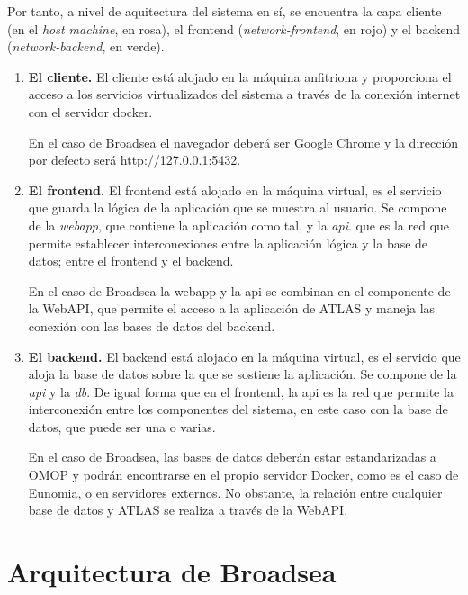 {\begin{enumerate}
\end{enumerate}

Por tanto, a nivel de aquitectura del sistema en sí, se encuentra la capa cliente (en el \textit{host machine}, en rosa), el frontend (\textit{network-frontend}, en rojo) y el backend (\textit{network-backend}, en verde).

\begin{enumerate}

    \item \textbf{El cliente.} El cliente está alojado en la máquina anfitriona y proporciona el acceso a los servicios virtualizados del sistema a través de la conexión internet con el servidor docker.

     En el caso de Broadsea el navegador deberá ser Google Chrome y la dirección por defecto será http://127.0.0.1:5432.

    \item \textbf{El frontend.} El frontend está alojado en la máquina virtual, es el servicio que guarda la lógica de la aplicación que se muestra al usuario. Se compone de la \textit{webapp}, que contiene la aplicación como tal, y la \textit{api}. que es la red que permite establecer interconexiones entre la aplicación lógica y la base de datos; entre el frontend y el backend.

    En el caso de Broadsea la webapp y la api se combinan en el componente de la WebAPI, que permite el acceso a la aplicación de ATLAS y maneja las conexión con las bases de datos del backend.

    \item \textbf{El backend.} El backend está alojado en la máquina virtual, es el servicio que aloja la base de datos sobre la que se sostiene la aplicación. Se compone de la \textit{api} y la \textit{db}. De igual forma que en el frontend, la api es la red que permite la interconexión entre los componentes del sistema, en este caso con la base de datos, que puede ser una o varias.

    En el caso de Broadsea, las bases de datos deberán estar estandarizadas a OMOP y podrán encontrarse en el propio servidor Docker, como es el caso de Eunomia, o en servidores externos. No obstante, la relación entre cualquier base de datos y ATLAS se realiza a través de la WebAPI.

    
\end{enumerate}

\section{Arquitectura de Broadsea} \label{subsec:08Broadsea}

}
